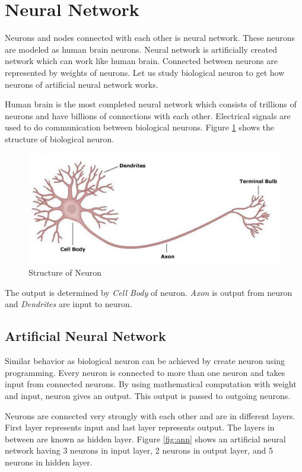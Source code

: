 \section{Neural Network}
Neurons and nodes connected with each other is neural network. These neurons are modeled as human brain neurons. Neural network is artificially created network which can work like human brain. Connected between neurons are represented by weights of neurons. Let us study biological neuron to get how neurons of artificial neural network works.
\par
Human brain is the most completed neural network which consists of trillions of neurons and have billions of connections with each other. Electrical signals are used to do communication between biological neurons. Figure \ref{neuron} shows the structure of biological neuron.
\begin{figure}[H]
  \centering
  \includegraphics[scale=0.14]{images/Chapter2/neuron.png}
  \caption{Structure of Neuron \cite{neuron}}
  \label{neuron}
\end{figure}
\par
The output is determined by \textit{Cell Body} of neuron. \textit{Axon} is output from neuron and \textit{Dendrites} are input to neuron.

\subsection{Artificial Neural Network}
Similar behavior as biological neuron can be achieved by create neuron using programming. Every neuron is connected to more than one neuron and takes input from connected neurons. By using mathematical computation with weight and input, neuron gives an output. This output is passed to outgoing neurons.
\par
Neurons are connected very strongly with each other and are in different layers. First layer represents input and last layer represents output. The layers in between are known as hidden layer. Figure \ref{fig:ann} shows an artificial neural network having 3 neurons in input layer, 2 neurons in output layer, and 5 neurons in hidden layer.


